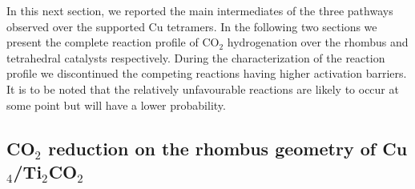 \begin{table}

 \caption{Binding energy of molecules on the rhombus (Rh) and tetrahedral (Th) tetramers (Cu$_4$/Ti$_2$CO$_2$) without ($E_{bind}$) and with ($E^S_{bind}$) entropy corrections (at 500 K and 1 bar pressure.)}
 \label{tab:2}
  \begin{center}
  \end{center}
\end{table} 

In this next section, we reported the main intermediates of the three pathways observed over the supported Cu tetramers. In the following two sections we present the complete reaction profile of CO$_2$ hydrogenation over the rhombus and tetrahedral catalysts respectively. During the characterization of the reaction profile we discontinued the competing reactions having higher activation barriers. It is to be noted that the relatively unfavourable reactions are likely to occur at some point but will have a lower probability.   
 
\subsection{CO\texorpdfstring{$_2$}{} reduction on the rhombus geometry of Cu\texorpdfstring{$_4$}{}/Ti\texorpdfstring{$_2$}{}CO\texorpdfstring{$_2$}{}}


